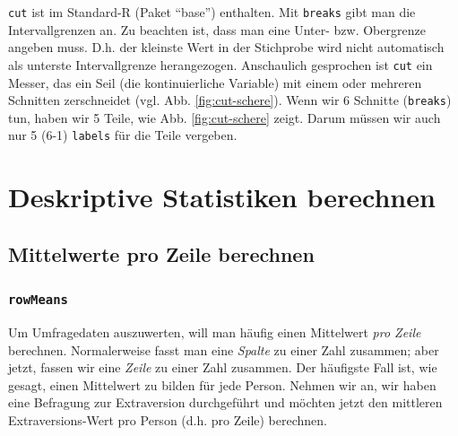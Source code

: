 \documentclass[12pt,ngerman,]{book}
\makeatletter
\newenvironment{Shaded}{\begin{snugshade}}{\end{snugshade}}
\newcommand{\KeywordTok}[1]{\textcolor[rgb]{0.13,0.29,0.53}{\textbf{{#1}}}}
\newcommand{\StringTok}[1]{\textcolor[rgb]{0.31,0.60,0.02}{{#1}}}
\newcommand{\CommentTok}[1]{\textcolor[rgb]{0.56,0.35,0.01}{\textit{{#1}}}}
\newcommand{\NormalTok}[1]{{#1}}
\newenvironment{kframe}{%
\medskip{}
\setlength{\fboxsep}{.8em}
 \def\at@end@of@kframe{}%
 \ifinner\ifhmode%
  \def\at@end@of@kframe{\end{minipage}}%
  \begin{minipage}{\columnwidth}%
 \fi\fi%
 \def\FrameCommand##1{\hskip\@totalleftmargin \hskip-\fboxsep
 \colorbox{shadecolor}{##1}\hskip-\fboxsep
     \hskip-\linewidth \hskip-\@totalleftmargin \hskip\columnwidth}%
 \MakeFramed {\advance\hsize-\width
   \@totalleftmargin\z@ \linewidth\hsize
   \@setminipage}}%
 {\par\unskip\endMakeFramed%
 \at@end@of@kframe}
\renewenvironment{Shaded}{\begin{kframe}}{\end{kframe}}
\theoremstyle{definition}
\theoremstyle{definition}
\theoremstyle{remark}
\makeatother
\begin{document}
\texttt{cut} ist im Standard-R (Paket ``base'') enthalten. Mit
\texttt{breaks} gibt man die Intervallgrenzen an. Zu beachten ist, dass
man eine Unter- bzw. Obergrenze angeben muss. D.h. der kleinste Wert in
der Stichprobe wird nicht automatisch als unterste Intervallgrenze
herangezogen. Anschaulich gesprochen ist \texttt{cut} ein Messer, das
ein Seil (die kontinuierliche Variable) mit einem oder mehreren
Schnitten zerschneidet (vgl. Abb. \ref{fig:cut-schere}). Wenn wir 6
Schnitte (\texttt{breaks}) tun, haben wir 5 Teile, wie Abb.
\ref{fig:cut-schere} zeigt. Darum müssen wir auch nur 5 (6-1)
\texttt{labels} für die Teile vergeben.

\section{Deskriptive Statistiken
berechnen}\label{deskriptive-statistiken-berechnen}

\subsection{Mittelwerte pro Zeile
berechnen}\label{mittelwerte-pro-zeile-berechnen}

\subsubsection{\texorpdfstring{\texttt{rowMeans}}{rowMeans}}\label{rowmeans}

Um Umfragedaten auszuwerten, will man häufig einen Mittelwert \emph{pro
Zeile} berechnen. Normalerweise fasst man eine \emph{Spalte} zu einer
Zahl zusammen; aber jetzt, fassen wir eine \emph{Zeile} zu einer Zahl
zusammen. Der häufigste Fall ist, wie gesagt, einen Mittelwert zu bilden
für jede Person. Nehmen wir an, wir haben eine Befragung zur
Extraversion durchgeführt und möchten jetzt den mittleren
Extraversions-Wert pro Person (d.h. pro Zeile) berechnen.

\begin{Shaded}
\end{Shaded}
\end{document}
